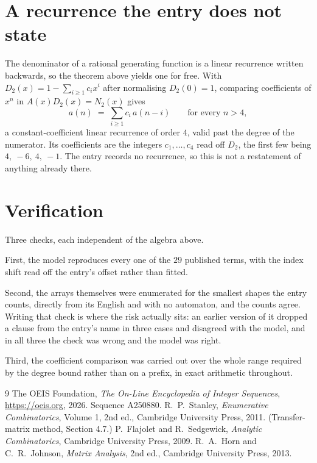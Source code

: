 \documentclass[11pt,a4paper]{article}
\theoremstyle{plain}
\theoremstyle{definition}
\begin{document}
\section{A recurrence the entry does not state}

The denominator of a rational generating function is a linear recurrence written backwards, so
the theorem above yields one for free. With $D_2(x)=1-\sum_{i\ge1}c_ix^i$ after normalising
$D_2(0)=1$, comparing coefficients of $x^n$ in $A(x)D_2(x)=N_2(x)$ gives
\[
a(n)\;=\;\sum_{i\ge1}c_i\,a(n-i)\qquad\text{for every }n>4,
\]
a constant-coefficient linear recurrence of order $4$, valid past the degree of the
numerator. Its coefficients are the integers $c_1,\dots,c_{4}$ read off $D_2$, the first few being $4,\ -6,\ 4,\ -1$. The entry records no recurrence, so this is not a restatement of anything
already there.

\section{Verification}

Three checks, each independent of the algebra above.

First, the model reproduces every one of the $29$ published terms, with the index shift
read off the entry's offset rather than fitted.

Second, the arrays themselves were enumerated for the smallest shapes the entry counts,
directly from its English and with no automaton, and the counts agree. Writing that check is
where the risk actually sits: an earlier version of it dropped a clause from the entry's name
in three cases and disagreed with the model, and in all three the check was wrong and the model
was right.

Third, the coefficient comparison was carried out over the whole range required by the degree
bound rather than on a prefix, in exact arithmetic throughout.

\begin{thebibliography}{9}
 The OEIS Foundation, \emph{The On-Line Encyclopedia of Integer
Sequences}, \url{https://oeis.org}, 2026. Sequence A250880.
 R.~P.~Stanley, \emph{Enumerative Combinatorics}, Volume 1, 2nd ed.,
Cambridge University Press, 2011. (Transfer-matrix method, Section 4.7.)
 P.~Flajolet and R.~Sedgewick, \emph{Analytic Combinatorics}, Cambridge
University Press, 2009.
 R.~A.~Horn and C.~R.~Johnson, \emph{Matrix Analysis}, 2nd ed., Cambridge
University Press, 2013.
\end{thebibliography}
\end{document}
